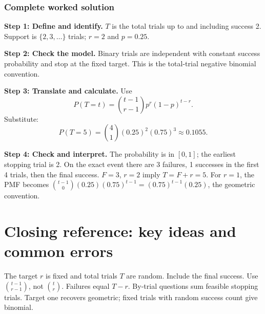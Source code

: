 \subsubsection*{Complete worked solution}
\par\noindent\begin{minipage}{\linewidth}
\textbf{Step 1: Define and identify.} $T$ is the total trials up to and including success 2. Support is $\{2,3,\ldots\}$ trials; $r=2$ and $p=0.25$.
\end{minipage}\par\medskip
\par\noindent\begin{minipage}{\linewidth}
\textbf{Step 2: Check the model.} Binary trials are independent with constant success probability and stop at the fixed target. This is the total-trial negative binomial convention.
\end{minipage}\par\medskip
\par\noindent\begin{minipage}{\linewidth}
\textbf{Step 3: Translate and calculate.} Use
\[P(T=t)=\binom{t-1}{r-1}p^r(1-p)^{t-r}.\]
Substitute:
\[P(T=5)=\binom{4}{1}(0.25)^2(0.75)^{3}\approx 0.1055.\]
\end{minipage}\par\medskip
\par\noindent\begin{minipage}{\linewidth}
\textbf{Step 4: Check and interpret.} The probability is in $[0,1]$; the earliest stopping trial is 2. On the exact event there are 3 failures, 1 successes in the first 4 trials, then the final success. $F=3$, $r=2$ imply $T=F+r=5$. For $r=1$, the PMF becomes $\binom{t-1}{0}(0.25)(0.75)^{t-1}=(0.75)^{t-1}(0.25)$, the geometric convention.
\end{minipage}\par\medskip
{}
\section{Closing reference: key ideas and common errors}
The target $r$ is fixed and total trials $T$ are random. Include the final success. Use $\binom{t-1}{r-1}$, not $\binom tr$. Failures equal $T-r$. By-trial questions sum feasible stopping trials. Target one recovers geometric; fixed trials with random success count give binomial.
\secInicio

